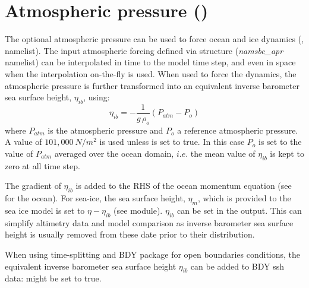 \documentclass[../tex_main/NEMO_manual]{subfiles}
\begin{document}
\section{Atmospheric pressure (\protect{})}
\label{sec:SBC_apr}


The optional atmospheric pressure can be used to force ocean and ice dynamics
(, \textit{} namelist).
The input atmospheric forcing defined via  structure (\textit{namsbc\_apr} namelist)
can be interpolated in time to the model time step, and even in space when the interpolation on-the-fly is used.
When used to force the dynamics, the atmospheric pressure is further transformed into
an equivalent inverse barometer sea surface height, $\eta_{ib}$, using:
\begin{equation} \label{eq:SBC_ssh_ib}
	\eta_{ib} = -  \frac{1}{g\,\rho_o}  \left( P_{atm} - P_o \right) 
\end{equation}
where $P_{atm}$ is the atmospheric pressure and $P_o$ a reference atmospheric pressure.
A value of $101,000~N/m^2$ is used unless  is set to true.
In this case $P_o$ is set to the value of $P_{atm}$ averaged over the ocean domain,
$i.e.$ the mean value of $\eta_{ib}$ is kept to zero at all time step.

The gradient of $\eta_{ib}$ is added to the RHS of the ocean momentum equation (see  for the ocean).
For sea-ice, the sea surface height, $\eta_m$, which is provided to the sea ice model is set to $\eta - \eta_{ib}$
(see  module).
$\eta_{ib}$ can be set in the output.
This can simplify altimetry data and model comparison as
inverse barometer sea surface height is usually removed from these date prior to their distribution.

When using time-splitting and BDY package for open boundaries conditions,
the equivalent inverse barometer sea surface height $\eta_{ib}$ can be added to BDY ssh data: 
  might be set to true.

\end{document}
